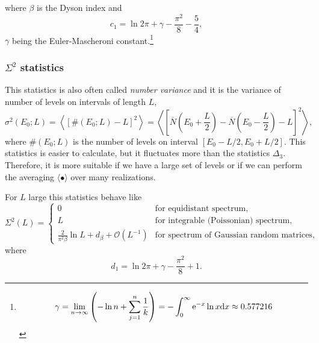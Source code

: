\documentclass[a4paper,11pt,twoside]{article}
\begin{document}
            where $\beta$ is the Dyson index and
            \begin{equation}
                c_{1}=\ln{2\pi}+\gamma-\frac{\pi^{2}}{8}-\frac{5}{4},
            \end{equation}
            $\gamma$ being the Euler-Mascheroni constant.\footnote{
                \begin{equation}
                    \gamma
                        =\lim_{n\rightarrow\infty}\left(-\ln{n}+\sum_{j=1}^{n}\frac{1}{k}\right)
                        =-\int_{0}^{\infty}\operatorname{e}^{-x}\ln{x}\mathrm{d} x\approx0.577216
                \end{equation}
            }

        \subsubsection{$\Sigma^{2}$ statistics}
            This statistics is also often called \emph{number variance} and it is the variance of number of levels on intervals of length $L$,
            \begin{equation}
                \sigma^{2}(E_{0};L)
                    =\left\langle\left[\#(E_{0};L)-L\right]^{2}\right\rangle
                    =\left\langle\left[\overline{N}\left(E_{0}+\frac{L}{2}\right)-\overline{N}\left(E_{0}-\frac{L}{2}\right)-L\right]^{2}\right\rangle,
                \label{eq:Sigma2}
            \end{equation}  
            where $\#(E_{0};L)$ is the number of levels on interval $[E_{0}-L/2,E_{0}+L/2]$.
            This statistics is easier to calculate, but it fluctuates more than the statistics $\Delta_{3}$.
            Therefore, it is more suitable if we have a large set of levels or if we can perform the averaging $\langle\bullet\rangle$ over many realizations. 
            
            For $L$ large this statistics behave like
            \begin{equation}
                \Sigma^{2}(L)=\left\{\begin{array}{ll}
                    0 & \text{for equidistant spectrum},\\
                    L & \text{for integrable (Poissonian) spectrum},\\
                    \frac{2}{\pi^{2}\beta}\ln L+d_{\beta}+\mathcal{O}(L^{-1}) & \text{for spectrum of Gaussian random matrices},
                \end{array}\right.
            \end{equation}
            where
            \begin{equation}
                d_{1}=\ln{2\pi}+\gamma-\frac{\pi^{2}}{8}+1.
            \end{equation}
\end{document}
